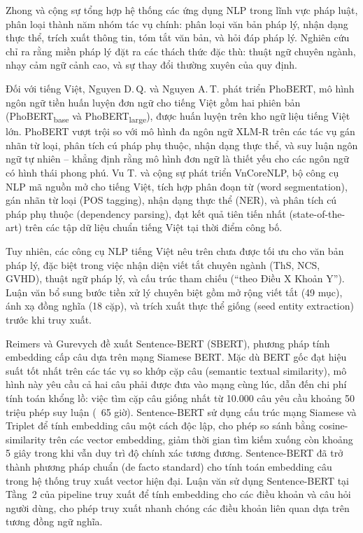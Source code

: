 Zhong và cộng sự \cite{zhong2020nlplaw} tổng hợp hệ thống các ứng dụng NLP trong
lĩnh vực pháp luật, phân loại thành năm nhóm tác vụ chính: phân loại văn bản pháp
lý, nhận dạng thực thể, trích xuất thông tin, tóm tắt văn bản, và hỏi đáp pháp lý.
Nghiên cứu chỉ ra rằng miền pháp lý đặt ra các thách thức đặc thù: thuật ngữ
chuyên ngành, nhạy cảm ngữ cảnh cao, và sự thay đổi thường xuyên của quy định.

\begin{sloppypar}
Đối với tiếng Việt, Nguyen D.\,Q. và Nguyen A.\,T. \cite{nguyen2020phobert} phát triển PhoBERT,
mô hình ngôn ngữ tiền huấn luyện đơn ngữ cho tiếng Việt gồm hai phiên bản
(PhoBERT\textsubscript{base} và PhoBERT\textsubscript{large}), được huấn luyện trên
kho ngữ liệu tiếng Việt lớn. PhoBERT vượt trội so với mô hình đa ngôn ngữ XLM-R
trên các tác vụ gán nhãn từ loại, phân tích cú pháp phụ thuộc, nhận dạng thực thể,
và suy luận ngôn ngữ tự nhiên -- khẳng định rằng mô hình đơn ngữ là thiết yếu cho
các ngôn ngữ có hình thái phong phú. Vu T. và cộng sự \cite{vu2018vncore} phát triển
VnCoreNLP, bộ công cụ NLP mã nguồn mở cho tiếng Việt, tích hợp phân đoạn từ
(word segmentation), gán nhãn từ loại (POS tagging), nhận dạng thực thể (NER), và
phân tích cú pháp phụ thuộc (dependency parsing), đạt kết quả tiên tiến nhất
(state-of-the-art) trên các tập dữ liệu chuẩn tiếng Việt tại thời điểm công bố.
\end{sloppypar}

Tuy nhiên, các công cụ NLP tiếng Việt nêu trên chưa được tối ưu cho văn bản pháp
lý, đặc biệt trong việc nhận diện viết tắt chuyên ngành (ThS, NCS, GVHD), thuật
ngữ pháp lý, và cấu trúc tham chiếu (``theo Điều X Khoản Y''). Luận văn bổ sung
bước tiền xử lý chuyên biệt gồm mở rộng viết tắt (49 mục), ánh xạ đồng nghĩa
(18 cặp), và trích xuất thực thể giống (seed entity extraction) trước khi truy xuất.

Reimers và Gurevych \cite{reimers2019sbert} đề xuất Sentence-BERT (SBERT), phương
pháp tính embedding cấp câu dựa trên mạng Siamese BERT. Mặc dù BERT gốc đạt hiệu
suất tốt nhất trên các tác vụ so khớp cặp câu (semantic textual similarity), mô
hình này yêu cầu cả hai câu phải được đưa vào mạng cùng lúc, dẫn đến chi phí tính
toán khổng lồ: việc tìm cặp câu giống nhất từ 10.000 câu yêu cầu khoảng 50 triệu
phép suy luận (~65 giờ). Sentence-BERT sử dụng cấu trúc mạng Siamese và Triplet để
tính embedding câu một cách độc lập, cho phép so sánh bằng cosine-similarity trên
các vector embedding, giảm thời gian tìm kiếm xuống còn khoảng 5 giây trong khi vẫn
duy trì độ chính xác tương đương. Sentence-BERT đã trở thành phương pháp chuẩn (de
facto standard) cho tính toán embedding câu trong hệ thống truy xuất vector hiện đại.
Luận văn sử dụng Sentence-BERT tại Tầng~2 của pipeline truy xuất để tính embedding
cho các điều khoản và câu hỏi người dùng, cho phép truy xuất nhanh chóng các điều
khoản liên quan dựa trên tương đồng ngữ nghĩa.

